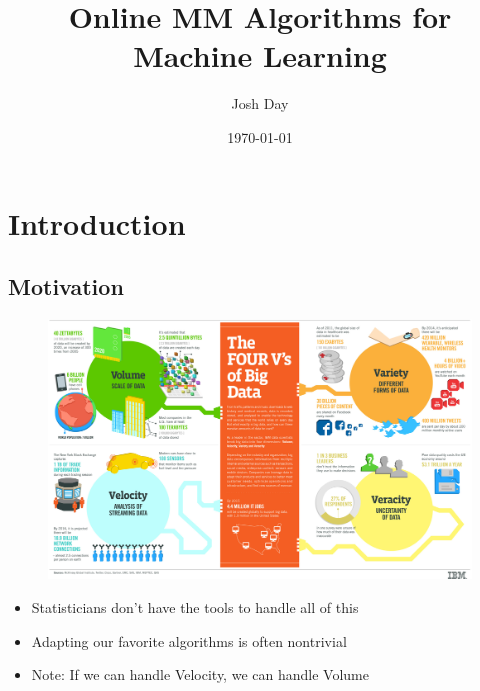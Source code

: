 \documentclass{beamer}
\title[Online MM]{Online MM Algorithms for Machine Learning}
\author{Josh Day}
\institute[NC State University]{NC State University \\ \textit{jtday2@ncsu.edu}}
\date{\today}
\begin{document}
\begin{frame}
\titlepage
\end{frame}


\section{Introduction}
\subsection{Motivation}
\begin{frame}
  \begin{figure}
    \includegraphics[width=\linewidth]{figures/4vs.jpg}
  \end{figure}
\end{frame}
\begin{frame}
  \begin{itemize}
    \item Statisticians don't have the tools to handle all of this
    \item Adapting our favorite algorithms is often nontrivial
    \item Note: If we can handle Velocity, we can handle Volume
  \end{itemize}
\end{frame}

\end{document}
